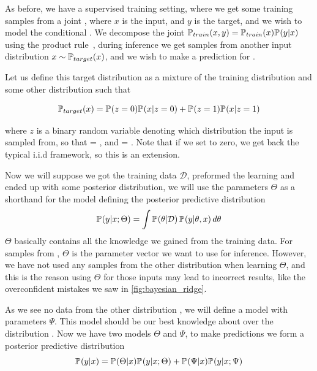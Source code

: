 \documentclass[../main.tex]{subfiles}
\begin{document}
As before, we have a supervised training setting, where we get some training samples from a joint , where $x$ is the input, and $y$ is the target, and we wish to model the conditional . We decompose the joint $\pdf[train]{x,y} = \pdf[train]{x} \pdf{y|x}$ using the product rule~\citep[chapter~2]{mackay2003information}, during inference we get samples from another input distribution $x\sim\pdf[target]{x}$, and we wish to make a prediction for . 

Let us define this target distribution as a mixture of the training distribution and some other distribution such that

\begin{equation}
    \pdf[target]{x} = \pdf{z=0} \pdf{x|z=0} + \pdf{z=1} \pdf[]{x|z=1}
\end{equation}{}

where $z$ is a binary random variable denoting which distribution the input is sampled from, so that  = , and  = . 
Note that if we set  to zero, we get back the typical i.i.d framework, so this is an extension.

Now we will suppose we got the training data $\mathcal{D}$, preformed the learning and ended up with some posterior distribution, we will use the parameters $\Theta$ as a shorthand for the model defining the posterior predictive distribution
$$
    \pdf{y|x; \Theta}=  \int \pdf{\theta | \mathcal{D}}\, \pdf{y|\theta, x} \, d\theta
$$
$\Theta$ basically contains all the knowledge we gained from the training data. For samples from , $\Theta$ is the parameter vector we want to use for inference. However, we have not used any samples from the other distribution  when learning $\Theta$, and this is the reason using $\Theta$ for those inputs may lead to incorrect results, like the overconfident mistakes we saw in \cref{fig:bayesian_ridge}. 

As we see no data from the other distribution , we will define a model with parameters $\Psi$. This model should be our best knowledge about  over the distribution . 
Now we have two models $\Theta$ and $\Psi$, to make predictions we form a posterior predictive distribution
$$
    \pdf{y|x} = \pdf{\Theta|x} \pdf{y| x; \Theta} + \pdf{\Psi|x} \pdf{y | x; \Psi}
$$
\end{document}

